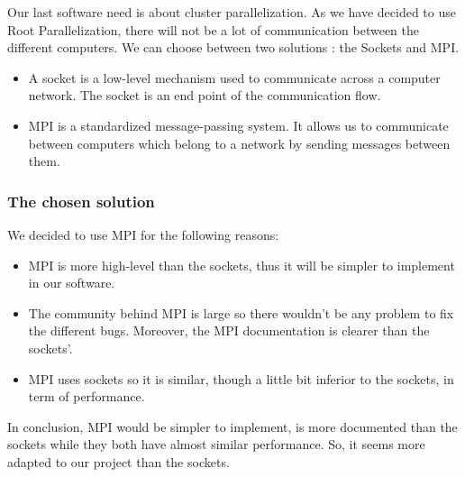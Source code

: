 Our last software need is about cluster parallelization. As we have decided to use Root Parallelization, there will not be a lot of communication between the different computers. We can choose between two solutions : the Sockets and MPI.
\begin{itemize}
\item A socket is  a low-level mechanism used to communicate across a computer network. The socket is an end point of the communication flow.
\item MPI is a standardized message-passing system. It allows us to communicate between computers which belong to a network by sending messages between them. 
\end{itemize}
\subsubsection{The chosen solution}

We decided to use MPI for the following reasons:
\begin{itemize}
\item MPI is more high-level than the sockets, thus it will be simpler to implement in our software.
\item The community behind MPI is large so there wouldn't be any problem to fix the different bugs. Moreover, the MPI documentation is clearer than the sockets'. 
\item MPI uses sockets so it is similar, though a little bit inferior to the sockets, in term of performance.
\end{itemize}
In conclusion, MPI would be simpler to implement, is more documented than the sockets while they both have almost similar performance. So, it seems more adapted to our project than the sockets.